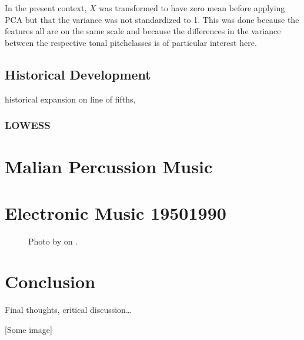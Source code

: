 \documentclass[letterpaper,10pt,english]{sphinxmanual}
\begin{document}
In the present context, \(X\) was transformed to have zero mean before applying PCA
but that the variance was not standardized to 1.
This was done because the features all are on the same scale and because the
differences in the variance between the respective tonal pitch\sphinxhyphen{}classes is of particular
interest here.


\section{Historical Development}
\label{\detokenize{tonality:historical-development}}
historical expansion on line of fifths,


\subsection{LOWESS}
\label{\detokenize{tonality:lowess}}

\chapter{Malian Percussion Music}
\label{\detokenize{mali_percussion:malian-percussion-music}}\label{\detokenize{mali_percussion::doc}}

\chapter{Electronic Music 1950\textendash{}1990}
\label{\detokenize{electronic:electronic-music-1950-1990}}\label{\detokenize{electronic::doc}}
\begin{figure}[htbp]
\centering
\capstart

\noindent{}
\caption{Photo by 
on .}\label{\detokenize{electronic:id1}}\end{figure}


\chapter{Conclusion}
\label{\detokenize{conclusion:conclusion}}\label{\detokenize{conclusion::doc}}
Final thoughts, critical discussion…

{[}Some image{]}
\end{document}
